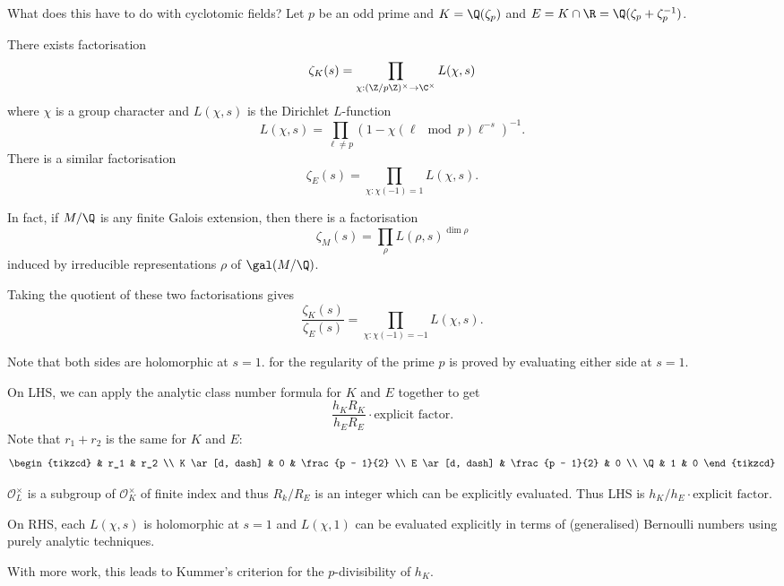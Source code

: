 \documentclass[a4paper]{article}
\renewcommand*{\O}{\mathcal{O}}
\begin{document}
What does this have to do with cyclotomic fields? Let \(p\) be an odd prime and \(K = \Q(\zeta_p)\) and \(E = K \cap \R = \Q(\zeta_p + \zeta_p^{-1})\).

There exists factorisation
\[
  \zeta_K(s) = \prod_{\chi: (\Z/p\Z)^\times \to \C^\times} L(\chi, s)
\]
where \(\chi\) is a group character and \(L(\chi, s)\) is the Dirichlet \(L\)-function
\[
  L(\chi, s) = \prod_{\ell \neq p} (1 - \chi (\ell \mod p) \ell^{-s})^{-1}.
\]
There is a similar factorisation
\[
  \zeta_E(s) = \prod_{\chi: \chi(-1) = 1} L(\chi, s).
\]

In fact, if \(M/\Q\) is any finite Galois extension, then there is a factorisation
\[
  \zeta_M(s) = \prod_\rho L(\rho, s)^{\dim \rho}
\]
induced by irreducible representations \(\rho\) of \(\gal(M/\Q)\).

Taking the quotient of these two factorisations gives
\[
  \frac{\zeta_K(s)}{\zeta_E(s)} = \prod_{\chi: \chi(-1) = -1} L(\chi, s).
\]

Note that both sides are holomorphic at \(s = 1\).  for the regularity of the prime \(p\) is proved by evaluating either side at \(s = 1\).

On LHS, we can apply the analytic class number formula for \(K\) and \(E\) together to get
\[
  \frac{h_K R_K}{h_E R_E} \cdot \text{explicit factor}.
\]
Note that \(r_1 + r_2\) is the same for \(K\) and \(E\):
\[
  \begin{tikzcd}
    & r_1 & r_2 \\
    K \ar[d, dash] & 0 & \frac{p - 1}{2} \\
    E \ar[d, dash] & \frac{p - 1}{2} & 0 \\
    \Q & 1 & 0
  \end{tikzcd}
\]

\(\O_L^\times\) is a subgroup of \(\O_K^\times\) of finite index and thus \(R_k/R_E\) is an integer which can be explicitly evaluated. Thus LHS is \(h_K/h_E \cdot \text{explicit factor}\).

On RHS, each \(L(\chi, s)\) is holomorphic at \(s = 1\) and \(L(\chi, 1)\) can be evaluated explicitly in terms of (generalised) Bernoulli numbers using purely analytic techniques.

With more work, this leads to Kummer's criterion for the \(p\)-divisibility of \(h_K\).

\printindex
\end{document}
